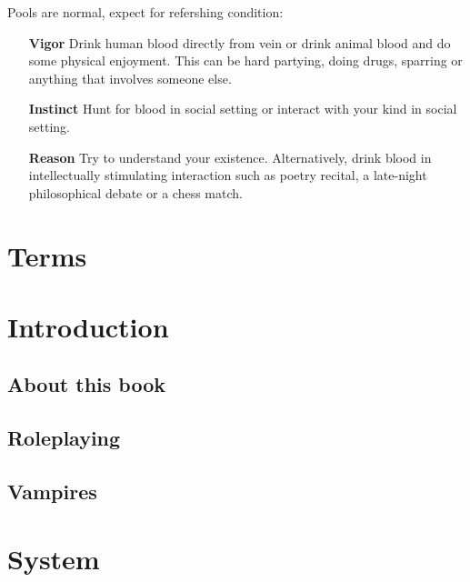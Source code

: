 \documentclass[a4paper, 12pt, finnish]{article}
\begin{document}
{\cols{
\VampiricKey{}
}

\pagebreak
Pools are normal, expect for refershing condition:

\begin{itemize}
\item[\textbf{Vigor}] Drink human blood directly from vein or drink animal blood and do some physical enjoyment. This can be hard partying, doing drugs, sparring or anything that involves someone else.
\item[\textbf{Instinct}] Hunt for blood in social setting or interact with your kind in social setting.
\item[\textbf{Reason}] Try to understand your existence. Alternatively, drink blood in intellectually stimulating interaction such as poetry recital, a late-night philosophical debate or a chess match.
\end{itemize}
}

\begin{titlepage}
\maketitle
\end{titlepage}


\pagebreak
\tableofcontents
\pagebreak

\section{Terms}\label{sec:terms}
\section{Introduction}\label{sec:introduction}
	\subsection{About this book}\label{ssec:about}
		
	\subsection{Roleplaying}\label{ssec:roleplaying}
		
	\subsection{Vampires}\label{ssec:vampires}
		
\section{System}\label{sec:System}
\end{document}
